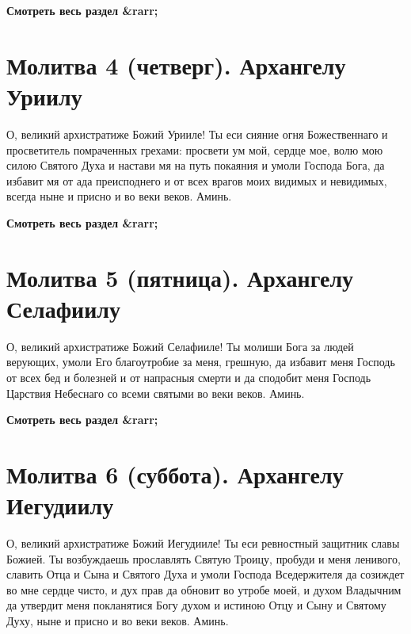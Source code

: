 \bfseries Смотреть весь раздел &rarr;\normalfont{} 

\section{Молитва 4 (четверг).    Архангелу Уриилу}



О, великий архистратиже Божий Урииле! Ты еси сияние огня Божественнаго и просветитель помраченных грехами: просвети ум мой, сердце мое, волю мою силою Святого Духа и настави мя на путь покаяния и умоли Господа Бога, да избавит мя от ада преисподнего и от всех врагов моих видимых и невидимых, всегда ныне и присно и во веки веков. Аминь.


\mychapterending




\bfseries Смотреть весь раздел &rarr;\normalfont{} 

\section{Молитва 5 (пятница).    Архангелу Селафиилу}



О, великий архистратиже Божий Селафииле! Ты молиши Бога за людей верующих, умоли Его благоутробие за меня, грешную, да избавит меня Господь от всех бед и болезней и от напрасныя смерти и да сподобит меня Господь Царствия Небеснаго со всеми святыми во веки веков. Аминь.


\mychapterending




\bfseries Смотреть весь раздел &rarr;\normalfont{} 

\section{Молитва 6 (суббота).   Архангелу Иегудиилу}



О, великий архистратиже Божий Иегудииле! Ты еси ревностный защитник славы Божией. Ты возбуждаешь прославлять Святую Троицу, пробуди и меня ленивого, славить Отца и Сына и Святого Духа и умоли Господа Вседержителя да созиждет во мне сердце чисто, и дух прав да обновит во утробе моей, и духом Владычним да утвердит меня покланятися Богу духом и истиною Отцу и Сыну и Святому Духу, ныне и присно и во веки веков. Аминь.


